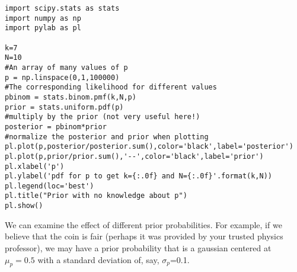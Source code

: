 \begin{lstlisting}[frame=single] 
import scipy.stats as stats
import numpy as np
import pylab as pl

k=7
N=10
#An array of many values of p
p = np.linspace(0,1,100000)
#The corresponding likelihood for different values
pbinom = stats.binom.pmf(k,N,p)
prior = stats.uniform.pdf(p)
#multiply by the prior (not very useful here!)
posterior = pbinom*prior
#normalize the posterior and prior when plotting
pl.plot(p,posterior/posterior.sum(),color='black',label='posterior')
pl.plot(p,prior/prior.sum(),'--',color='black',label='prior')
pl.xlabel('p')
pl.ylabel('pdf for p to get k={:.0f} and N={:.0f}'.format(k,N))
pl.legend(loc='best')
pl.title("Prior with no knowledge about p")
pl.show()
\end{lstlisting}



We can examine the effect of different prior probabilities. For example, if we believe that the coin is fair (perhaps it was provided by your trusted physics professor), we may have a prior probability that is a gaussian centered at $\mu_p=0.5$ with a standard deviation of, say, $\sigma_p$=0.1.


